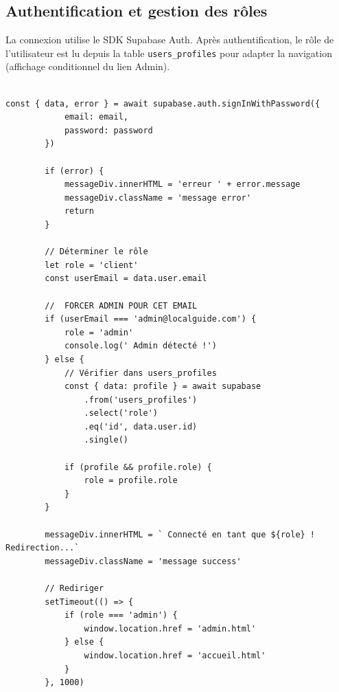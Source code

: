 \documentclass[12pt,a4paper]{report}
\begin{document}
\subsection{Authentification et gestion des rôles}

La connexion utilise le SDK Supabase Auth. Après authentification, le rôle de l'utilisateur
est lu depuis la table \texttt{users\_profiles} pour adapter la navigation (affichage
conditionnel du lien Admin).
\begin{lstlisting}[caption=Connexion et détection du rôle (login.html)]

const { data, error } = await supabase.auth.signInWithPassword({
            email: email,
            password: password
        })
        
        if (error) {
            messageDiv.innerHTML = 'erreur ' + error.message
            messageDiv.className = 'message error'
            return
        }
        
        // Déterminer le rôle
        let role = 'client'
        const userEmail = data.user.email
        
        //  FORCER ADMIN POUR CET EMAIL
        if (userEmail === 'admin@localguide.com') {
            role = 'admin'
            console.log(' Admin détecté !')
        } else {
            // Vérifier dans users_profiles
            const { data: profile } = await supabase
                .from('users_profiles')
                .select('role')
                .eq('id', data.user.id)
                .single()
            
            if (profile && profile.role) {
                role = profile.role
            }
        }
        
        messageDiv.innerHTML = ` Connecté en tant que ${role} ! Redirection...`
        messageDiv.className = 'message success'
        
        // Rediriger
        setTimeout(() => {
            if (role === 'admin') {
                window.location.href = 'admin.html'
            } else {
                window.location.href = 'accueil.html'
            }
        }, 1000)
\end{lstlisting}
\end{document}
